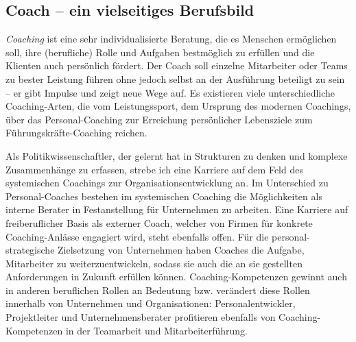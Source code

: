 \documentclass[11pt,a4paper]{article}
\begin{document}
\subsection*{\textsf{Coach -- ein vielseitiges Berufsbild}}


\textsl{Coaching} ist eine sehr individualisierte Beratung, die es Menschen ermöglichen soll, ihre (berufliche) Rolle und Aufgaben bestmöglich zu erfüllen und die Klienten auch persönlich fördert. Der Coach soll einzelne Mitarbeiter oder Teams zu bester Leistung führen ohne jedoch selbst an der Ausführung beteiligt zu sein -- er gibt Impulse und zeigt neue Wege auf. Es existieren viele unterschiedliche Coaching-Arten, die vom Leistungssport, dem Ursprung des modernen Coachings, über das Personal-Coaching zur Erreichung persönlicher Lebensziele zum Führungskräfte-Coaching reichen.

Als Politikwissenschaftler, der gelernt hat in Strukturen zu denken und komplexe Zusammenhänge zu erfassen, strebe ich eine Karriere auf dem Feld des systemischen Coachings zur Organisationsentwicklung an. Im Unterschied zu Personal-Coaches bestehen im systemischen Coaching die Möglichkeiten als interne Berater in Festanstellung für Unternehmen zu arbeiten. Eine Karriere auf freiberuflicher Basis als externer Coach, welcher von Firmen für konkrete Coaching-Anlässe engagiert wird, steht ebenfalls offen. Für die personal-strategische Zielsetzung von Unternehmen haben Coaches die Aufgabe, Mitarbeiter zu weiterzuentwickeln, sodass sie auch die an sie gestellten Anforderungen in Zukunft erfüllen können. Coaching-Kompetenzen gewinnt auch in anderen beruflichen Rollen an Bedeutung bzw. verändert diese Rollen innerhalb von Unternehmen und Organisationen: Personalentwickler, Projektleiter und Unternehmensberater profitieren ebenfalls von Coaching-Kompetenzen in der Teamarbeit und Mitarbeiterführung.

\newpage
\end{document}
